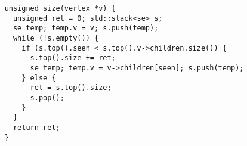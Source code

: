 \documentclass{beamer}
\begin{document}
\begin{frame}[fragile]
  \begin{lstlisting}
    unsigned size(vertex *v) {
      unsigned ret = 0; std::stack<se> s;
      se temp; temp.v = v; s.push(temp);
      while (!s.empty()) {
        if (s.top().seen < s.top().v->children.size()) {
          s.top().size += ret;
          se temp; temp.v = v->children[seen]; s.push(temp);
        } else {
          ret = s.top().size;
          s.pop();
        }
      }
      return ret;
    }
  \end{lstlisting}
\end{frame}
\end{document}
